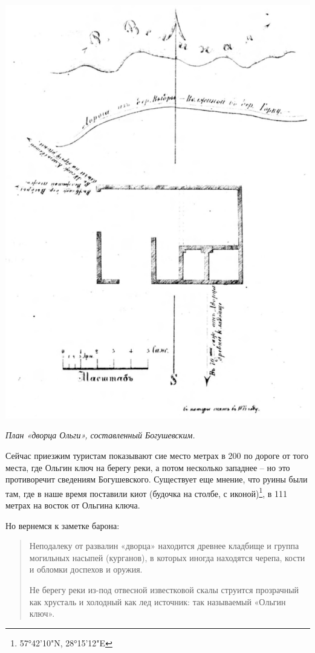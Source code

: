 \begin{center}
\includegraphics[width=0.92\linewidth]{chast-volga/vybuty/volga-dvorec.png}

\textit{План «дворца Ольги», составленный Богушевским.}
\end{center}

Сейчас приезжим туристам показывают сие место метрах в 200 по дороге от того места, где Ольгин ключ на берегу реки, а потом несколько западнее – но это противоречит сведениям Богушевского. Существует еще мнение, что руины были там, где в наше время поставили киот (будочка на столбе, с иконой)\footnote{57°42'10"N, 28°15'12"E}, в 111 метрах на восток от Ольгина ключа. 

Но вернемся к заметке барона:

\begin{quotation}
Неподалеку от развалин «дворца» находится древнее кладбище и группа могильных насыпей (курганов), в которых иногда находятся черепа, кости и обломки доспехов и оружия. 

Не берегу реки из-под отвесной известковой скалы струится прозрачный как хрусталь и холодный как лед источник: так называемый «Ольгин ключ».
\end{quotation}


